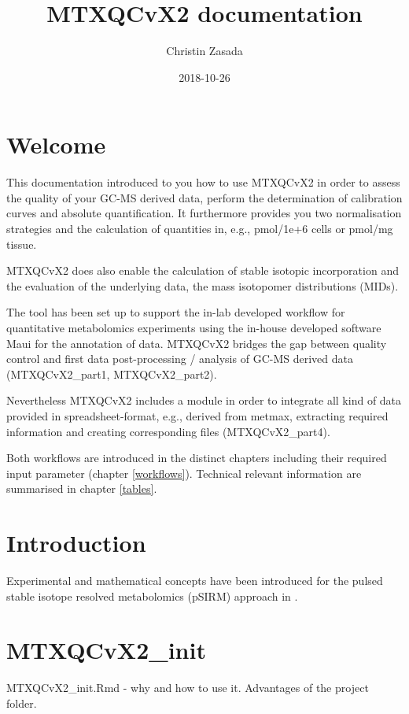 \documentclass[]{book}
\title{MTXQCvX2 documentation}
\author{Christin Zasada}
\date{2018-10-26}
\theoremstyle{definition}
\theoremstyle{definition}
\theoremstyle{definition}
\theoremstyle{remark}
\begin{document}
\maketitle

{
\setcounter{tocdepth}{1}
\tableofcontents
}
\chapter{Welcome}\label{welcome}

This documentation introduced to you how to use MTXQCvX2 in order to
assess the quality of your GC-MS derived data, perform the determination
of calibration curves and absolute quantification. It furthermore
provides you two normalisation strategies and the calculation of
quantities in, e.g., pmol/1e+6 cells or pmol/mg tissue.

MTXQCvX2 does also enable the calculation of stable isotopic
incorporation and the evaluation of the underlying data, the mass
isotopomer distributions (MIDs).

The tool has been set up to support the in-lab developed workflow for
quantitative metabolomics experiments using the in-house developed
software Maui for the annotation of data. MTXQCvX2 bridges the gap
between quality control and first data post-processing / analysis of
GC-MS derived data (MTXQCvX2\_part1, MTXQCvX2\_part2).

Nevertheless MTXQCvX2 includes a module in order to integrate all kind
of data provided in spreadsheet-format, e.g., derived from metmax,
extracting required information and creating corresponding files
(MTXQCvX2\_part4).

Both workflows are introduced in the distinct chapters including their
required input parameter (chapter \ref{workflows}). Technical relevant
information are summarised in chapter \ref{tables}.

\chapter{Introduction}\label{intro}

Experimental and mathematical concepts have been introduced for the
pulsed stable isotope resolved metabolomics (pSIRM) approach in
\citep{Pietzke2014}.

\chapter{MTXQCvX2\_init}\label{init}

MTXQCvX2\_init.Rmd - why and how to use it. Advantages of the project
folder.
\end{document}
